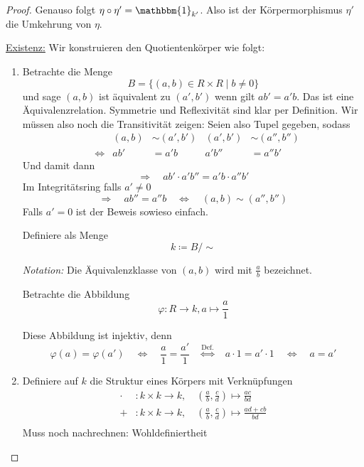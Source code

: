 \documentclass[a4paper,12pt,numbers=noenddot,parskip=full]{scrartcl}
\newcommand{\heading}{\underline}
\theoremstyle{dotless}
\theoremstyle{remark}
\begin{document}
\begin{proof}
		Genauso folgt $\eta \circ \eta'= \mathbbm{1}_{k'}$. Also ist der Körpermorphismus $\eta'$ die Umkehrung von $\eta$.
		
		\heading{Existenz:} Wir konstruieren den Quotientenkörper wie folgt:
		\begin{enumerate}
			\item Betrachte die Menge
			\begin{equation*}
				B = \{ (a,b) \in R \times R \mid b \neq 0 \}
			\end{equation*}
			und sage $(a,b)$ ist äquivalent zu $(a', b')$ wenn gilt $a b' = a' b$. Das ist eine Äquivalenzrelation. Symmetrie und Reflexivität sind klar per Definition. Wir müssen also noch die Transitivität zeigen: Seien also Tupel gegeben, sodass
			\begin{align*}
				&&(a,b) &\sim (a', b') & (a', b') &\sim (a'',b'') \\
				&\Leftrightarrow& ab' &= a'b & a'b'' &= a''b'
			\end{align*}
			Und damit dann
			\begin{equation*}
				\Rightarrow\quad ab' \cdot a'b'' = a' b \cdot a'' b'
			\end{equation*}
			Im Integritätsring falls $a' \neq 0$
			\begin{equation*}
				\Rightarrow\quad a b'' = a'' b \quad\Leftrightarrow\quad (a,b) \sim (a'',b'')
			\end{equation*}
			Falls $a' = 0$ ist der Beweis sowieso einfach.
			
			Definiere als Menge
			\begin{equation*}
				k \coloneqq B / \sim
			\end{equation*}
			
			\textit{Notation:} Die Äquivalenzklasse von $(a,b)$ wird mit $\frac{a}{b}$ bezeichnet.
			
			Betrachte die Abbildung
			\begin{equation*}
				\varphi: R \to k, a \mapsto \frac{a}{1}
			\end{equation*}
			
			Diese Abbildung ist injektiv, denn 
			\begin{equation*}
				\varphi(a) = \varphi(a') \quad\Leftrightarrow\quad \frac{a}{1} = \frac{a'}{1} \overset{\text{Def.}}{\quad\Leftrightarrow\quad} a \cdot 1 = a' \cdot 1 \quad\Leftrightarrow\quad a = a'
			\end{equation*}
			\item Definiere auf $k$ die Struktur eines Körpers mit Verknüpfungen
			\begin{align*}
				\cdot&: k \times k \to k, \quad \left(\frac{a}{b}, \frac{c}{d}\right) \mapsto \frac{ac}{bd} \\
				+&: k \times k \to k, \quad \left(\frac{a}{b}, \frac{c}{d}\right) \mapsto \frac{ad + cb}{bd} \\
			\end{align*}
			Muss noch nachrechnen: Wohldefiniertheit
			

\end{enumerate}
\end{proof}
\end{document}
